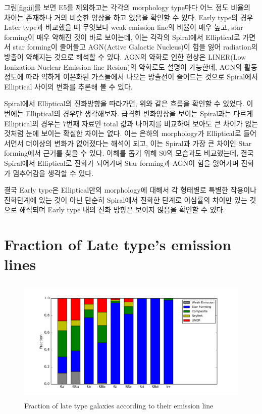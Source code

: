 \documentclass[a4paper,11pt]{article}
\begin{document}
그림\ref{fig:ii}를 보면 E5를 제외하고는 각각의 morphology type마다 어느 정도 비율의 차이는 존재하나 거의 비슷한 양상을 하고 있음을 확인할 수 있다.
Early type의 경우 Later type과 비교했을 때 무엇보다 weak emission line의 비율이 매우 높고, star forming이 매우 약해진 것이 바로 보이는데, 이는 각각의 Spiral에서 Elliptical로 가면서 star forming이 줄어들고 
AGN(Active Galactic Nucleus)이 힘을 잃어 radiation의 방출이 약해지는 것으로 해석할 수 있다. AGN의 약화로 인한 현상은 LINER(Low Ionization Nuclear Emission line Resion)의 약화로도 설명이 가능한데,
AGN의 활동 정도에 따라 약하게 이온화된 가스들에서 나오는 방출선이 줄어드는 것으로 Spiral에서 Elliptical 사이의 변화를 추론해 볼 수 있다.

Spiral에서 Elliptical의 진화방향을 따라가면, 위와 같은 흐름을 확인할 수 있었다. 이번에는 Elliptical의 경우만 생각해보자.
급격한 변화양상을 보이는 Spiral과는 다르게 Elliptical의 경우는 7번째 자료인 total 값과 나머지를 비교하여 보아도 큰 차이가 없는 것처럼 눈에 보이는 확실한 차이는 없다.
이는 은하의 morphology가 Elliptical로 들어서면서 더이상의 변화가 없어졌다는 해석이 되고, 이는 Spiral과 가장 큰 차이인 Star forming에서 근거를 찾을 수 있다.
이해를 돕기 위해 S0의 모습과도 비교했는데, 결국 Spiral에서 Elliptical로 진화가 되어가며 Star forming과 AGN이 힘을 잃어가며 진화가 멈추어감을 생각할 수 있다.

결국 Early type은 Elliptical만의 morphology에 대해서 각 형태별로 특별한 작용이나 진화단계에 있는 것이 아닌 단순히 Spiral에서 진화한 단계로 이심률의 차이만 있는 것으로 해석되며 Early type 내의 진화 방향은 보이지 않음을 확인할 수 있다.

\newpage

\section{Fraction of Late type's emission lines}


\begin{figure}[h]
\centering
\includegraphics[height=60mm, width=100 mm]{Latebar.png}
\caption{\label{fig:iii} Fraction of late type galaxies according to their emission line }
\end{figure}
\end{document}
